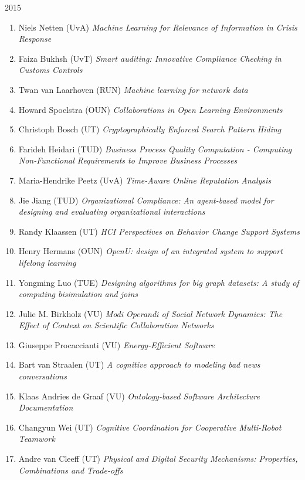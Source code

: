\begin{multicols}{2}
\begin{scriptsize}
\vspace{0.2cm}
2015	
\vspace{0.2cm}
\begin{enumerate}[leftmargin=*,noitemsep,topsep=0pt,parsep=1pt,partopsep=0pt]
\renewcommand{\labelenumi}{2015-\arabic{enumi}}
\item Niels Netten (UvA) \textit{Machine Learning for Relevance of Information in Crisis Response
}\item Faiza Bukhsh (UvT) \textit{Smart auditing: Innovative Compliance Checking in Customs Controls
}\item Twan van Laarhoven (RUN) \textit{Machine learning for network data
}\item Howard Spoelstra (OUN) \textit{Collaborations in Open Learning Environments
}\item Christoph Bosch (UT) \textit{Cryptographically Enforced Search Pattern Hiding
}\item Farideh Heidari (TUD) \textit{Business Process Quality Computation - Computing Non-Functional Requirements to Improve Business Processes 
}\item Maria-Hendrike Peetz (UvA) \textit{Time-Aware Online Reputation Analysis
}\item Jie Jiang (TUD) \textit{Organizational Compliance: An agent-based model for designing and evaluating organizational interactions 
}\item Randy Klaassen (UT) \textit{HCI Perspectives on Behavior Change Support Systems
}\item Henry Hermans (OUN) \textit{OpenU: design of an integrated system to support lifelong learning
}\item Yongming Luo (TUE) \textit{Designing algorithms for big graph datasets: A study of computing bisimulation and joins
}\item Julie M. Birkholz (VU) \textit{Modi Operandi of Social Network Dynamics: The Effect of Context on Scientific Collaboration Networks
}\item Giuseppe Procaccianti (VU) \textit{Energy-Efficient Software
}\item Bart van Straalen (UT) \textit{A cognitive approach to modeling bad news conversations
}\item Klaas Andries de Graaf (VU) \textit{Ontology-based Software Architecture Documentation
}\item Changyun Wei (UT) \textit{Cognitive Coordination for Cooperative Multi-Robot Teamwork
}\item Andre van Cleeff (UT) \textit{Physical and Digital Security Mechanisms: Properties, Combinations and Trade-offs
}
\end{enumerate}
\end{scriptsize}
\end{multicols}
